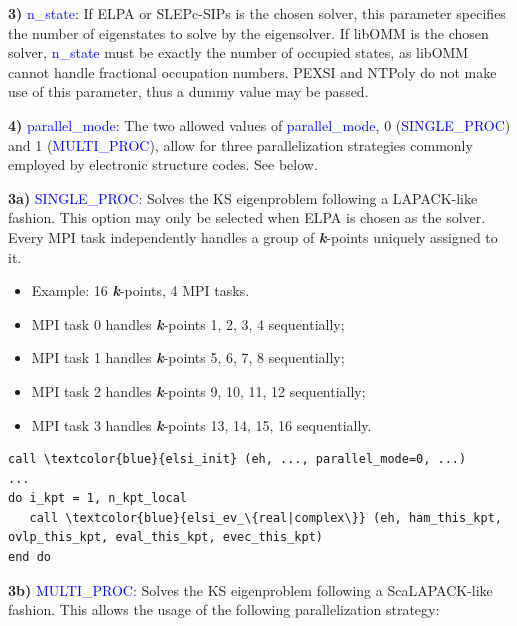 \documentclass{report}
\begin{document}
\textbf{3)} \textcolor{blue}{n\_state}:  If ELPA or SLEPc-SIPs is the chosen solver, this parameter specifies the number of eigenstates to solve by the eigensolver.  If libOMM is the chosen solver, \textcolor{blue}{n\_state} must be exactly the number of occupied states, as libOMM cannot handle fractional occupation numbers\cite{libomm_corsetti_2014}.  PEXSI and NTPoly do not make use of this parameter, thus a dummy value may be passed.

\textbf{4)} \textcolor{blue}{parallel\_mode}:  The two allowed values of \textcolor{blue}{parallel\_mode}, 0 (\textcolor{blue}{SINGLE\_PROC}) and 1 (\textcolor{blue}{MULTI\_PROC}), allow for three parallelization strategies commonly employed by electronic structure codes.  See below.

\textbf{3a)} \textcolor{blue}{SINGLE\_PROC}:  Solves the KS eigenproblem following a LAPACK-like fashion.  This option may only be selected when ELPA is chosen as the solver.  Every MPI task independently handles a group of \textbf{\textit{k}}-points uniquely assigned to it.
\begin{itemize}
\item Example:  16 \textbf{\textit{k}}-points, 4 MPI tasks.
\item MPI task 0 handles \textbf{\textit{k}}-points 1, 2, 3, 4 sequentially;
\item MPI task 1 handles \textbf{\textit{k}}-points 5, 6, 7, 8 sequentially;
\item MPI task 2 handles \textbf{\textit{k}}-points 9, 10, 11, 12 sequentially;
\item MPI task 3 handles \textbf{\textit{k}}-points 13, 14, 15, 16 sequentially.
\end{itemize}

\begin{tcolorbox}
\begin{Verbatim}[commandchars=\\\{\}]
call \textcolor{blue}{elsi_init} (eh, ..., parallel_mode=0, ...)
...
do i_kpt = 1, n_kpt_local
   call \textcolor{blue}{elsi_ev_\{real|complex\}} (eh, ham_this_kpt, ovlp_this_kpt, eval_this_kpt, evec_this_kpt)
end do
\end{Verbatim}
\end{tcolorbox}

\textbf{3b)} \textcolor{blue}{MULTI\_PROC}:  Solves the KS eigenproblem following a ScaLAPACK-like fashion.  This allows the usage of the following parallelization strategy:
\end{document}

